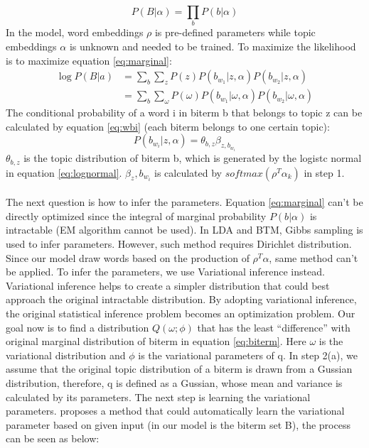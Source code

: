 \begin{equation}
    P(B|\alpha) = \prod_bP(b|\alpha)
    \label{eq:corpus}
\end{equation}
In the model, word embeddings $\rho$ is pre-defined parameters while topic embeddings $\alpha$ is unknown and needed to be trained.
To maximize the likelihood is to maximize equation \ref{eq:marginal}:
\begin{equation}
    \begin{aligned}
        \log P(B|a) & = \sum_{b}\sum_zP(z)P(b_{w_1}|z,\alpha)P(b_{w_2}|z,\alpha)\\
        & = \sum_{b}\sum_\omega P(\omega)P(b_{w_1}|\omega,\alpha)P(b_{w_2}|\omega,\alpha)
    \end{aligned} 
    \label{eq:marginal}
\end{equation}
The conditional probability of a word i in biterm b that belongs to topic z can be calculated by equation \ref{eq:wbi} (each biterm belongs to one certain topic):
\begin{equation}
    P(b_{w_i}|z,\alpha) = \theta_{b,z}\beta_{z,b_{w_i}}
\label{eq:wbi}
\end{equation}
$\theta_{b,z}$ is the topic distribution of biterm b, which is generated by the logistc normal in equation \ref{eq:lognormal}. $\beta_z,b_{w_i}$ is calculated by $softmax(\rho^T\alpha_k)$ in step 1.
\\\\
The next question is how to infer the parameters. Equation \ref{eq:marginal} can't be directly optimized since the integral of marginal probability $P(b|\alpha)$ is intractable (EM algorithm cannot be used). In LDA and BTM, Gibbs sampling is used to infer parameters. However, such method requires Dirichlet distribution. Since our model draw words based on the production of $\rho^T\alpha$, same method can't be applied. To infer the parameters, we use Variational inference\cite{wainwright2008graphical} instead. Variational inference helps to create a simpler distribution that could best approach the original intractable distribution. By adopting variational inference, the original statistical inference problem becomes an optimization problem. Our goal now is to find a distribution $Q(\omega; \phi)$ that has the least ``difference'' with original marginal distribution of biterm in equation \ref{eq:biterm}. Here $\omega$ is the variational distribution and $\phi$ is the variational parameters of q.
In step 2(a), we assume that the original topic distribution of a biterm is drawn from a Gussian distribution, therefore, q is defined as a Gussian, whose mean and variance is calculated by its parameters. The next step is learning the variational parameters. \cite{kingma2013auto} proposes a method that could automatically learn the variational parameter based on given input (in our model is the biterm set B), the process can be seen as below:
